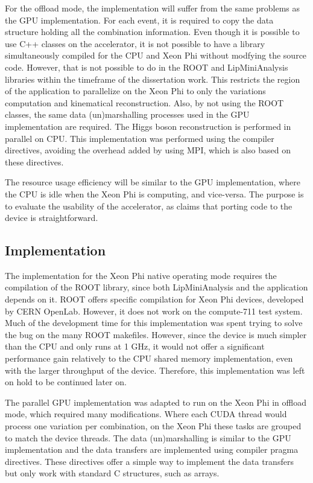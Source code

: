 For the offload mode, the implementation will suffer from the same problems as the GPU implementation. For each event, it is required to copy the data structure holding all the combination information. Even though it is possible to use C++ classes on the accelerator, it is not possible to have a library simultaneously compiled for the CPU and Xeon Phi without modfying the source code. However, that is not possible to do in the ROOT and LipMiniAnalysis libraries within the timeframe of the dissertation work. This restricts the region of the application to parallelize on the Xeon Phi to only the variations computation and kinematical reconstruction. Also, by not using the ROOT classes, the same data (un)marshalling processes used in the GPU implementation are required. The Higgs boson reconstruction is performed in parallel on CPU. This implementation was performed using the \intel compiler directives, avoiding the overhead added by using MPI, which is also based on these directives.

The resource usage efficiency will be similar to the GPU implementation, where the CPU is idle when the Xeon Phi is computing, and vice-versa. The purpose is to evaluate the usability of the accelerator, as \intel claims that porting code to the device is straightforward.

\subsection{Implementation}
\label{MICImplementation}

The implementation for the Xeon Phi native operating mode requires the compilation of the ROOT library, since both LipMiniAnalysis and the application depends on it. ROOT offers specific compilation for \intel Xeon Phi devices, developed by CERN OpenLab. However, it does not work on the compute-711 test system. Much of the development time for this implementation was spent trying to solve the bug on the many ROOT makefiles. However, since the device is much simpler than the CPU and only runs at 1 GHz, it would not offer a significant performance gain relatively to the CPU shared memory implementation, even with the larger throughput of the device. Therefore, this implementation was left on hold to be continued later on.

The parallel GPU implementation was adapted to run on the Xeon Phi in offload mode, which required many modifications. Where each CUDA thread would process one variation per combination, on the Xeon Phi these tasks are grouped to match the device threads. The data (un)marshalling is similar to the GPU implementation and the data transfers are implemented using compiler pragma directives. These directives offer a simple way to implement the data transfers but only work with standard C structures, such as arrays.

